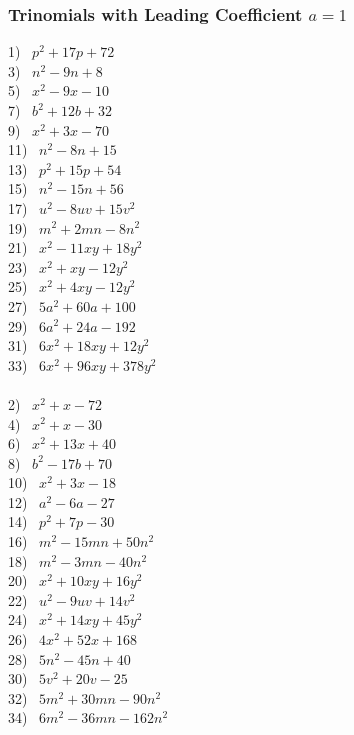 \subsubsection{Trinomials with Leading Coefficient $a=1$}

{}
\label{ais1}
\begin{multicols}{2}
  1)~ $p^2 + 17 p + 72$\\
  3)~ $n^2 - 9 n + 8$\\
  5)~ $x^2 - 9 x - 10$\\
  7)~ $b^2 + 12 b + 32$\\
  9)~ $x^2 + 3 x - 70$\\
  11)~ $n^2 - 8 n + 15$\\
  13)~ $p^2 + 15 p + 54$\\
  15)~ $n^2 - 15 n + 56$\\
  17)~ $u^2 - 8 u v + 15 v^2$\\
  19)~ $m^2 + 2 m n - 8 n^2$\\
  21)~ $x^2 - 11 x y + 18 y^2$\\
  23)~ $x^2 + x y - 12 y^2$\\
  25)~ $x^2 + 4 x y - 12 y^2$\\
  27)~ $5 a^2 + 60 a + 100$\\
  29)~ $6 a^2 + 24 a - 192$\\
  31)~ $6 x^2_{} + 18 x y + 12 y^2$\\
  33)~ $6 x^2 + 96 x y + 378 y^2$\\
~\\
  2)~ $x^2_{} + x - 72$\\
  4)~ $x^2 + x - 30$\\
  6)~ $x^2 + 13 x + 40$\\
  8)~ $b^2 - 17 b + 70$\\
  10)~ $x^2 + 3 x - 18$\\
  12)~ $a^2 - 6 a - 27$\\
  14)~ $p^2 + 7 p - 30$\\
  16)~ $m^2 - 15 m n + 50 n^2$\\
  18)~ $m^2 - 3 m n - 40 n^2$\\
  20)~ $x^2 + 10 x y + 16 y^2$\\
  22)~ $u^2 - 9 u v + 14 v^2$\\
  24)~ $x^2 + 14 x y + 45 y^2$\\
  26)~ $4 x^2 + 52 x + 168$\\
  28)~ $5 n^2 - 45 n + 40$\\
  30)~ $5 v^2 + 20 v - 25$\\
  32)~ $5 m^2 + 30 m n - 90 n^2$\\
  34)~ $6 m^2 - 36 m n - 162 n^2$
\end{multicols}

